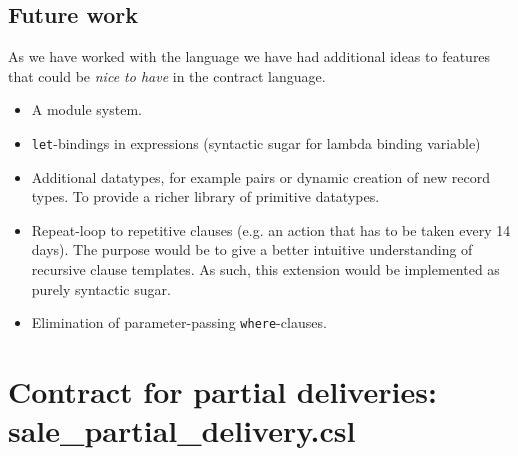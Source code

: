 \documentclass[10pt,a4paper,final,oneside,openany,article]{memoir}
\begin{document}
\section{Future work}
As we have worked with the language we have had additional ideas to
features that could be \textit{nice to have} in the contract language.

\begin{itemize}
\item A module system.
\item \lstinline{let}-bindings in expressions (syntactic sugar for
  lambda binding variable)
\item Additional datatypes, for example pairs or dynamic creation of
  new record types. To provide a richer library of primitive
  datatypes.
\item Repeat-loop to repetitive clauses (e.g. an action that has to be
  taken every 14 days). The purpose would be to give a better
  intuitive understanding of recursive clause templates. As such, this
  extension would be implemented as purely syntactic sugar.
\item Elimination of parameter-passing \lstinline{where}-clauses.
\end{itemize}

\printbibliography


\newpage
    \appendix
\chapter{Contract for partial deliveries: sale\_partial\_delivery.csl}
\label{chap:sale_partial_delivery}

\end{document}
